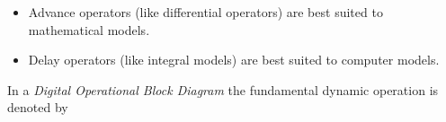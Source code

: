 \begin{slide}
  \label{slide:l7s6}
  \begin{itemize}
  \item Advance operators (like differential operators) are best suited
    to mathematical models.
  \item Delay operators (like integral models) are best suited to
    computer models.
  \end{itemize}
  In a \emph{Digital Operational Block Diagram} the fundamental
  dynamic operation is denoted by
  \begin{center}\end{center}
\end{slide}

\endinput

